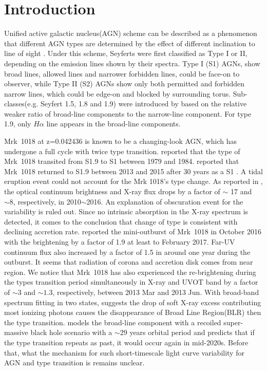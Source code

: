 \documentclass[twocolumn]{aastex63}
\begin{document}
\section{Introduction}\label{sec:intro} 
Unified active galactic nucleus(AGN) scheme can be described as a phenomenon that different AGN types are determined by the effect of different inclination to line of sight \citep[see][]{1993ARA&A..31..473A}. Under this scheme, Seyferts were first classified as Type I or II, depending on the emission lines shown by their spectra. Type I (S1) AGNs, show broad lines, allowed lines and narrower forbidden lines, could be face-on to observer, while Type II (S2) AGNs show only both permitted and forbidden narrow lines, which could be edge-on and blocked by surrounding torus. Sub-classes(e.g. Seyfert 1.5, 1.8 and 1.9) were introduced by \citet{1976MNRAS.176P..61O,1981ApJ...249..462O} based on the relative weaker ratio of broad-line components to the narrow-line component. For type 1.9, only $H\alpha$ line appears in the broad-line components. 

Mrk~1018 at z=0.042436 is known to be a changing-look AGN, which has undergone a full cycle with twice type transition. \citet{1986ApJ...311..135C} reported that the type of Mrk~1018 transited from S1.9 to S1 between 1979 and 1984. \citet{2016A&A...593L...8M} reported that Mrk~1018 returned to S1.9 between 2013 and 2015 after 30 years as a S1 \citep[see also][]{2017A&A...607L...9K}. A tidal eruption event could not account for the Mrk 1018's type change. As reported in \citet{2016A&A...593L...9H}, the optical continuum brightness and X-ray flux drops by a factor of $\sim$ 17 and $\sim 8$, respectively, in 2010$\sim$2016. An explanation of obscuration event for the variability is ruled out. Since no intrinsic absorption in the X-ray spectrum is detected, it comes to the conclusion that change of type is consistent with declining accretion rate. \citet{2017A&A...607L...9K} reported the mini-outburst of Mrk~1018 in October 2016 with the brightening by a factor of 1.9 at least to February 2017. Far-UV continuum flux also increased by a factor of 1.5 in around one year during the outburst. It seems that radiation of corona and accretion disk comes from near region. We notice that Mrk~1018 has also experienced the re-brightening during the types transition period simultaneously in X-ray and UVOT band by a factor of $\sim3$ and $\sim1.3$, respectively, between 2013 Mar and 2013 Jun. With broad-band spectrum fitting in two states, \citet{2018MNRAS.480.3898N} suggests the drop of soft X-ray excess contributing most ionizing photons causes the disappearance of Broad Line Region(BLR) then the type transition. \citet{2018ApJ...861...51K} models the broad-line component with a recoiled super-massive black hole scenario with a $\sim$29 years orbital period and predicts that if the type transition repeats as past, it would occur again in mid-2020s. Before that, what the mechanism for such short-timescale light curve variability for AGN and type transition is remains unclear. 
\end{document}
